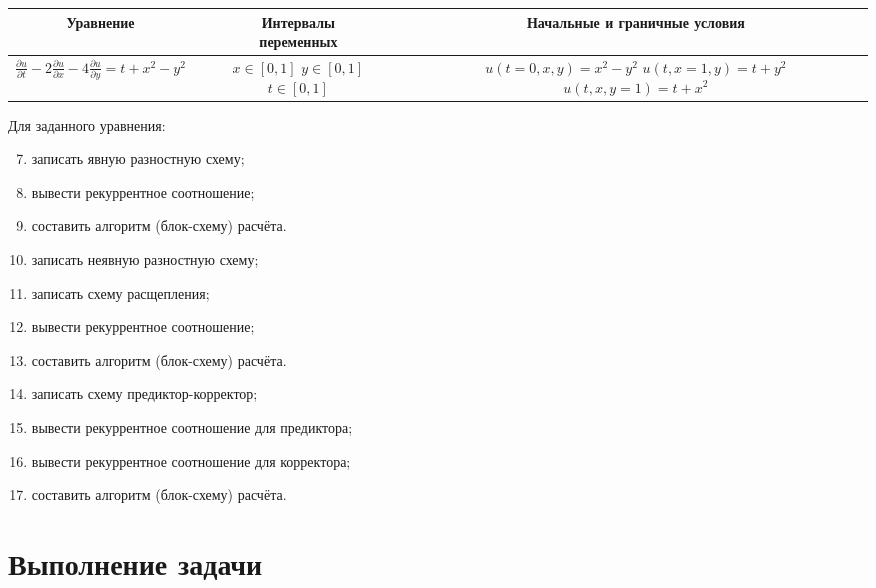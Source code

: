\documentclass[12pt, a4paper]{report}
\begin{document}
	\begin{center}
		\begin{tabular}{||c|c|c||}
			\hline
			Уравнение & \makecell{Интервалы \\ переменных} & Начальные и граничные условия \\

			\hline
			$ \frac{\partial u}{\partial t} - 2\frac{\partial u}{\partial x} - 4\frac{\partial u}{\partial y} = t + x^{2} - y^{2} $ & \makecell{$ x \in [0, 1] $ \\ $ y \in [0, 1] $ \\ $ t \in [0, 1] $} & \makecell{$ u(t = 0, x, y) = x^{2} - y^{2} $ \\ $ u(t, x = 1, y) = t + y^{2} $ \\ $ u(t, x, y = 1) = t + x^{2} $} \\

			\hline
		\end{tabular}
	\end{center}
	\par
	Для заданного уравнения:
	\begin{enumerate}
		\setcounter{enumi}{6}
		\item записать явную разностную схему;
		\item вывести рекуррентное соотношение;
		\item составить алгоритм (блок-схему) расчёта.
		\item записать неявную разностную схему;
		\item записать схему расщепления;
		\item вывести рекуррентное соотношение;
		\item составить алгоритм (блок-схему) расчёта.
		\item записать схему предиктор-корректор;
		\item вывести рекуррентное соотношение для предиктора;
		\item вывести рекуррентное соотношение для корректора;
		\item составить алгоритм (блок-схему) расчёта.
	\end{enumerate}

	\newpage

	\section*{Выполнение задачи}
\end{document}
